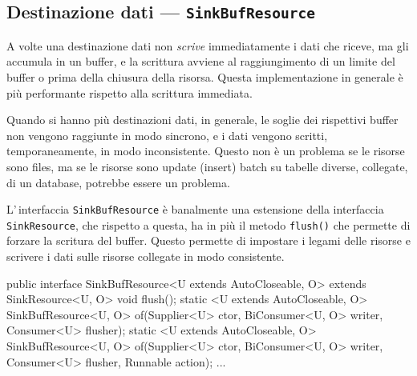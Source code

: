 \subsection{Destinazione dati --- \texttt{SinkBufResource}} \label{sec:snkBufRes}
A volte una destinazione dati non \textit{scrive} immediatamente i dati che 
riceve, ma gli accumula in un buffer, e la scrittura avviene al raggiungimento
di un limite del buffer o prima della chiusura della risorsa.
Questa implementazione in generale è più performante rispetto alla scrittura 
immediata.

Quando si hanno più destinazioni dati, in generale, le soglie dei rispettivi
buffer non vengono raggiunte in modo sincrono, e i dati vengono scritti, 
temporaneamente, in modo inconsistente.
Questo non è un problema se le risorse sono files, ma se le risorse sono update
(insert) batch su tabelle diverse, collegate, di un database, potrebbe essere 
un problema.

L'\,interfaccia \texttt{SinkBufResource} è banalmente una estensione della 
interfaccia \texttt{SinkResource}, che rispetto a questa, ha in più il metodo
\texttt{flush()} che permette di forzare la scritura del buffer.
Questo permette di impostare i legami delle risorse e scrivere i dati sulle 
risorse collegate in modo consistente.

\begin{elisting}[!htb]
\begin{javacode}
public interface SinkBufResource<U extends AutoCloseable, O> extends SinkResource<U, O> {
	void flush();
	static <U extends AutoCloseable, O>
    SinkBufResource<U, O> of(Supplier<U> ctor, BiConsumer<U, O> writer, Consumer<U> flusher);
    static <U extends AutoCloseable, O>
    SinkBufResource<U, O> of(Supplier<U> ctor, BiConsumer<U, O> writer, Consumer<U> flusher, Runnable action);
	...
}
\end{javacode}
\caption{Metodi per creare una risorsa \texttt{SinkBufResource} generica}
\label{lst:snkBufResGen}
\end{elisting}

